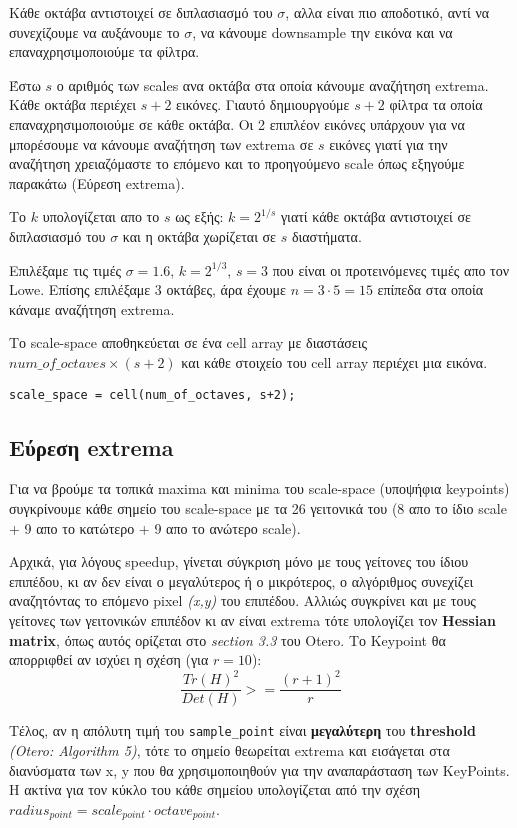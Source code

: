 \documentclass[11pt]{scrartcl} %
\begin{document}
Κάθε οκτάβα αντιστοιχεί σε διπλασιασμό του $\sigma$, αλλα είναι πιο αποδοτικό, αντί να συνεχίζουμε να αυξάνουμε το $\sigma$, να κάνουμε downsample την εικόνα και να επαναχρησιμοποιούμε τα φίλτρα.

Έστω $s$ ο αριθμός των scales ανα οκτάβα στα οποία κάνουμε αναζήτηση extrema.
Κάθε οκτάβα περιέχει $s+2$ εικόνες. Γιαυτό δημιουργούμε $s+2$ φίλτρα τα οποία επαναχρησιμοποιούμε σε κάθε οκτάβα.
Οι 2 επιπλέον εικόνες υπάρχουν για να μπορέσουμε να κάνουμε αναζήτηση των extrema σε $s$ εικόνες γιατί για την αναζήτηση χρειαζόμαστε το επόμενο και το προηγούμενο scale όπως εξηγούμε παρακάτω (Εύρεση extrema).

Το $k$ υπολογίζεται απο το $s$ ως εξής: $k = 2^{1/s}$ γιατί κάθε οκτάβα αντιστοιχεί σε διπλασιασμό του $\sigma$ και η οκτάβα χωρίζεται σε $s$ διαστήματα.

Επιλέξαμε τις τιμές $\sigma = 1.6$, $k = 2^{1/3}$, $s = 3$ που είναι οι προτεινόμενες τιμές απο τον Lowe\cite{lowe}.
Επίσης επιλέξαμε $3$ οκτάβες, άρα έχουμε $n = 3 \cdot 5 = 15$ επίπεδα στα οποία κάναμε αναζήτηση extrema.

Το scale-space αποθηκεύεται σε ένα cell array με διαστάσεις $num\_of\_octaves \times (s+2)$ και κάθε στοιχείο του cell array περιέχει μια εικόνα.
\begin{verbatim}
scale_space = cell(num_of_octaves, s+2);
\end{verbatim}

\subsection{Εύρεση extrema}

Για να βρούμε τα τοπικά maxima και minima του scale-space (υποψήφια keypoints) συγκρίνουμε κάθε σημείο του scale-space
με τα 26 γειτονικά του (8 απο το ίδιο scale + 9 απο το κατώτερο + 9 απο το ανώτερο scale).

Αρχικά, για λόγους speedup, γίνεται σύγκριση μόνο με τους γείτονες του ίδιου επιπέδου, κι αν δεν είναι ο μεγαλύτερος ή ο
μικρότερος, ο αλγόριθμος συνεχίζει αναζητόντας το επόμενο pixel \textit{(x,y)} του επιπέδου. Αλλιώς συγκρίνει και με τους
γείτονες των γειτονικών επιπέδον κι αν είναι extrema τότε υπολογίζει τον \textbf{Hessian matrix}, όπως αυτός ορίζεται στο
\textit{section 3.3} του Otero\cite{otero}. Το Keypoint θα απορριφθεί αν ισχύει η σχέση (για $r = 10$):
\[\frac{Tr(H)^2}{Det(H)} >= \frac{(r+1)^2}{r}\]

Τέλος, αν η απόλυτη τιμή του \texttt{sample\_point} είναι \textbf{μεγαλύτερη} του \textbf{threshold} \textit{(Otero: Algorithm 5)}\cite{otero},
τότε το σημείο θεωρείται extrema και εισάγεται στα διανύσματα των x, y που θα χρησιμοποιηθούν για την αναπαράσταση των KeyPoints.
Η ακτίνα για τον κύκλο του κάθε σημείου υπολογίζεται από την σχέση $radius_{point} = scale_{point}\cdot octave_{point}$.
\end{document}
